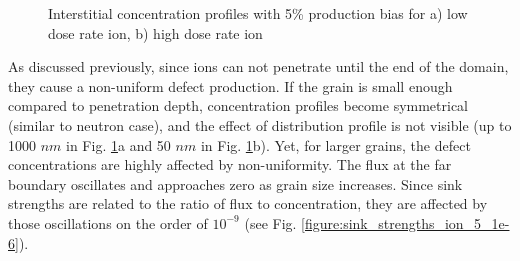 \documentclass[a4paper]{article}
\begin{document}
\begin{figure}[h!]
        \caption{Interstitial concentration profiles with 5\% production bias for a) low dose rate ion, b) high dose rate ion}
        \label{figure:concentrations_ion_5_1e-3_5-5000nm}
      \end{figure}

        As discussed previously, since ions can not penetrate until the end of the domain, they cause a non-uniform defect production. If the grain is small enough compared to penetration depth, concentration profiles become symmetrical (similar to neutron case), and the effect of distribution profile is not visible (up to 1000 $nm$ in Fig. \ref{figure:concentrations_ion_5_1e-3_5-5000nm}a and 50 $nm$ in Fig. \ref{figure:concentrations_ion_5_1e-3_5-5000nm}b). Yet, for larger grains, the defect concentrations are highly affected by non-uniformity. The flux at the far boundary oscillates and approaches zero as grain size increases. Since sink strengths are related to the ratio of flux to concentration, they are affected by those oscillations on the order of $10^{-9}$ (see Fig. \ref{figure:sink_strengths_ion_5_1e-6}).
\end{document}
